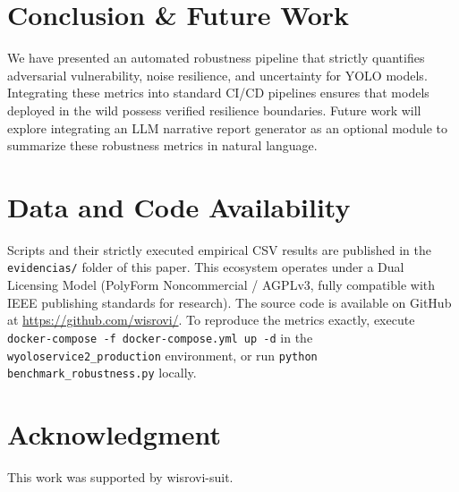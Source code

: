 \documentclass[conference]{IEEEtran}
\begin{document}
\section{Conclusion \& Future Work}
We have presented an automated robustness pipeline that strictly quantifies adversarial vulnerability, noise resilience, and uncertainty for YOLO models. Integrating these metrics into standard CI/CD pipelines ensures that models deployed in the wild possess verified resilience boundaries. Future work will explore integrating an LLM narrative report generator as an optional module to summarize these robustness metrics in natural language.

\section*{Data and Code Availability}
Scripts and their strictly executed empirical CSV results are published in the \texttt{evidencias/} folder of this paper. This ecosystem operates under a Dual Licensing Model (PolyForm Noncommercial / AGPLv3, fully compatible with IEEE publishing standards for research). The source code is available on GitHub at \url{https://github.com/wisrovi/}. To reproduce the metrics exactly, execute \texttt{docker-compose -f docker-compose.yml up -d} in the \texttt{wyoloservice2\_production} environment, or run \texttt{python benchmark\_robustness.py} locally.

\section*{Acknowledgment}
This work was supported by wisrovi-suit.



\end{document}
